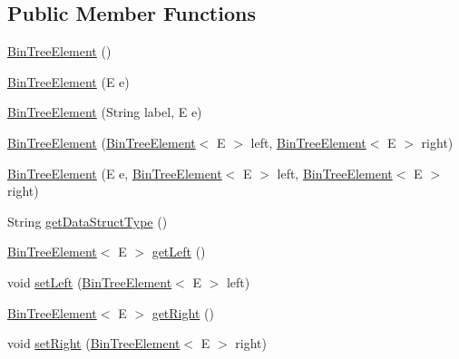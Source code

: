 \subsection*{Public Member Functions}
\begin{DoxyCompactItemize}
\item 
\mbox{\hyperlink{classbridges_1_1base_1_1_bin_tree_element_ad6dbf38d53a78be561039c46bde8bc47}{Bin\+Tree\+Element}} ()
\item 
\mbox{\hyperlink{classbridges_1_1base_1_1_bin_tree_element_a2d31fa068f962ced8702fdb4b36c9186}{Bin\+Tree\+Element}} (E e)
\item 
\mbox{\hyperlink{classbridges_1_1base_1_1_bin_tree_element_aac0e300f53d5c1c89b747a1f2c5d54c9}{Bin\+Tree\+Element}} (String label, E e)
\item 
\mbox{\hyperlink{classbridges_1_1base_1_1_bin_tree_element_ab402fac72353087b1b93e82db007e1d7}{Bin\+Tree\+Element}} (\mbox{\hyperlink{classbridges_1_1base_1_1_bin_tree_element}{Bin\+Tree\+Element}}$<$ E $>$ left, \mbox{\hyperlink{classbridges_1_1base_1_1_bin_tree_element}{Bin\+Tree\+Element}}$<$ E $>$ right)
\item 
\mbox{\hyperlink{classbridges_1_1base_1_1_bin_tree_element_a37f3def3cdf4a9eccf577d0ff3c704e9}{Bin\+Tree\+Element}} (E e, \mbox{\hyperlink{classbridges_1_1base_1_1_bin_tree_element}{Bin\+Tree\+Element}}$<$ E $>$ left, \mbox{\hyperlink{classbridges_1_1base_1_1_bin_tree_element}{Bin\+Tree\+Element}}$<$ E $>$ right)
\item 
String \mbox{\hyperlink{classbridges_1_1base_1_1_bin_tree_element_a60fa936692e168f70fb8567090c98883}{get\+Data\+Struct\+Type}} ()
\item 
\mbox{\hyperlink{classbridges_1_1base_1_1_bin_tree_element}{Bin\+Tree\+Element}}$<$ E $>$ \mbox{\hyperlink{classbridges_1_1base_1_1_bin_tree_element_aeb6fd894af8e158c9c48dd0749d1bd22}{get\+Left}} ()
\item 
void \mbox{\hyperlink{classbridges_1_1base_1_1_bin_tree_element_a5bcc2c1374a49f7ab2523ce53d204c30}{set\+Left}} (\mbox{\hyperlink{classbridges_1_1base_1_1_bin_tree_element}{Bin\+Tree\+Element}}$<$ E $>$ left)
\item 
\mbox{\hyperlink{classbridges_1_1base_1_1_bin_tree_element}{Bin\+Tree\+Element}}$<$ E $>$ \mbox{\hyperlink{classbridges_1_1base_1_1_bin_tree_element_aa3855c26617ada7248a9d4f83cf455b7}{get\+Right}} ()
\item 
void \mbox{\hyperlink{classbridges_1_1base_1_1_bin_tree_element_abc40e3ed4cfaf4b74aacfd3657e89ebc}{set\+Right}} (\mbox{\hyperlink{classbridges_1_1base_1_1_bin_tree_element}{Bin\+Tree\+Element}}$<$ E $>$ right)
\end{DoxyCompactItemize}
